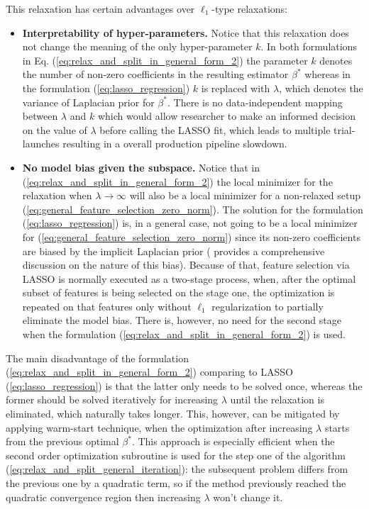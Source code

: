 \documentclass[11pt,letterpaper]{article}
\numberwithin{equation}{section} %
\numberwithin{figure}{section} %
\numberwithin{table}{section} %
\begin{document}
This relaxation has certain advantages over $\ell_1$-type relaxations:
\begin{itemize}
	\item \textbf{Interpretability of hyper-parameters.} Notice that this relaxation does not change the meaning of the only hyper-parameter $k$. In both formulations in Eq. (\ref{eq:relax_and_split_in_general_form_2}) the parameter $k$ denotes the number of non-zero coefficients in the resulting estimator $\beta^*$ whereas in the formulation (\ref{eq:lasso_regression}) $k$ is replaced with $\lambda$, which denotes the variance of Laplacian prior for $\beta^*$. There is no data-independent mapping between $\lambda$ and $k$ which would allow researcher to make an informed decision on the value of $\lambda$ before calling the LASSO fit, which leads to multiple trial-launches resulting in a overall production pipeline slowdown. 
	\item \textbf{No model bias given the subspace.} Notice that in (\ref{eq:relax_and_split_in_general_form_2}) the local minimizer for the relaxation when $\lambda \to \infty$ will also be a local minimizer for a non-relaxed setup (\ref{eq:general_feature_selection_zero_norm}). The solution for the formulation (\ref{eq:lasso_regression}) is, in a general case, not going to be a local minimizer for (\ref{eq:general_feature_selection_zero_norm}) since its non-zero coefficients are biased by the implicit Laplacian prior (\cite{Zou2006} provides a comprehensive discussion on the nature of this bias). Because of that, feature selection via LASSO is normally executed as a two-stage process, when, after the optimal subset of features is being selected on the stage one, the optimization is repeated on that features only without $\ell_1$ regularization to partially eliminate the model bias. There is, however, no need for the second stage when the formulation (\ref{eq:relax_and_split_in_general_form_2}) is used. 
\end{itemize} 

The main disadvantage of the formulation (\ref{eq:relax_and_split_in_general_form_2}) comparing to LASSO (\ref{eq:lasso_regression}) is that the latter only needs to be solved once, whereas the former should be solved iteratively for increasing $\lambda$ until the relaxation is eliminated, which naturally takes longer. This, however, can be mitigated by applying warm-start technique, when the optimization after increasing $\lambda$ starts from the previous optimal $\beta^*$. This approach is especially efficient when the second order optimization subroutine is used for the step one of the algorithm (\ref{eq:relax_and_split_general_iteration}): the subsequent problem differs from the previous one by a quadratic term, so if the method previously reached the quadratic convergence region then increasing $\lambda$ won't change it. 
\end{document}
